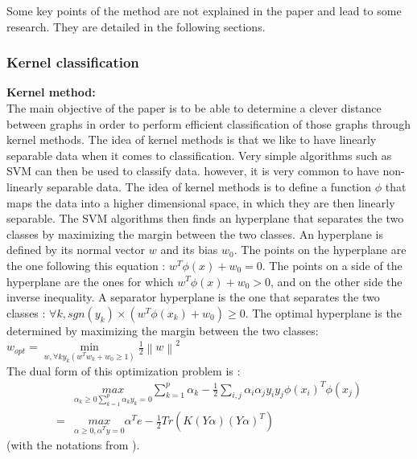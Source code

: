 \documentclass[a4paper,11pt]{article}
\begin{document}
Some key points of the method are not explained in the paper and lead to some research. 
They are detailed in the following sections.

\subsubsection{Kernel classification}

\textbf{Kernel method: } \\

The main objective of the paper is to be able to determine a clever distance between graphs in order to perform efficient classification of those graphs through kernel methods. 
The idea of kernel methods is that we like to have linearly separable data when it comes to classification. 
Very simple algorithms such as SVM can then be used to classify data. 
however, it is very common to have non-linearly separable data. 
The idea of kernel methods is to define a function $\phi$ that maps the data into a higher dimensional space, in which they are then linearly separable. 
The SVM algorithms then finds an hyperplane that separates the two classes by maximizing the margin between the two classes.
An hyperplane is defined by its normal vector $w$ and its bias $w_0$.
The points on the hyperplane are the one following this equation : $w^T \phi(x) + w_0 = 0$.
The points on a side of the hyperplane are the ones for which $w^T \phi(x) + w_0 > 0$, and on the other side the inverse inequality. 
A separator hyperplane is the one that separates the two classes : $\forall k, sgn(y_k) \times (w^T\phi(x_k)+w_0) \geq 0 $. 
The optimal hyperplane is the determined by maximizing the margin between the two classes:  \\

$w_{opt} =  \underset{w, \forall k y_k(w^Tw_k+w_0 \geq 1)}{\operatorname{min}}  \frac{1}{2} \left\lVert w\right\rVert^2 $\\[0.2cm]

The dual form of this optimization problem is : \\

\begin{align}
     & \underset{\alpha_k \geq 0 \sum_{k=1}^{p} \alpha_k y_k = 0 }{ max }   \sum_{k=1}^{p} \alpha_k -\frac{1}{2}  \sum_{i,j} \alpha_i \alpha_j y_i y_j \phi(x_i)^T \phi(x_j) \\
    = & \underset{\alpha \geq 0, \alpha^T y = 0 }{max}  \alpha^T e - \frac{1}{2}Tr(K(Y\alpha)(Y \alpha)^T) 
\end{align}
(with the notations from \cite{lanckriet2004learning}).\\[1cm]
\end{document}
